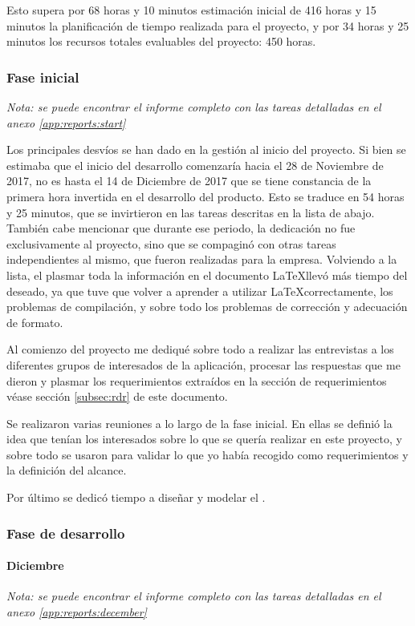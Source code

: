 Esto supera por 68 horas y 10 minutos estimación inicial de 416 horas y 15 
minutos la planificación de tiempo realizada para el proyecto, y por 34 horas y
25 minutos los recursos totales evaluables del proyecto: 450 horas.

\subsubsection{Fase inicial}
\textit{Nota: se puede encontrar el informe completo con las tareas detalladas
en el anexo \ref{app:reports:start}}

Los principales desvíos se han dado en la gestión al inicio del
proyecto. Si bien se estimaba que el inicio del desarrollo comenzaría hacia el
28 de Noviembre de 2017, no es hasta el 14 de Diciembre de 2017 que se tiene
constancia de la primera hora invertida en el desarrollo del producto. Esto se
traduce en 54 horas y 25 minutos, que se invirtieron en las tareas descritas en
la lista de abajo. También cabe mencionar que durante ese
periodo, la dedicación no fue exclusivamente al proyecto, sino que se compaginó
con otras tareas independientes al mismo, que fueron realizadas para la
empresa. Volviendo a la lista, el plasmar toda la
información en el documento \LaTeX llevó más tiempo del deseado, ya que tuve
que volver a aprender a utilizar \LaTeX correctamente, los problemas de
compilación, y sobre todo los problemas de corrección y adecuación de formato.

Al comienzo del proyecto me dediqué sobre todo a realizar las entrevistas a los
diferentes grupos de interesados de la aplicación, procesar las respuestas que me
dieron y plasmar los requerimientos extraídos en la sección de requerimientos \textemdash véase sección \ref{subsec:rdr} \textemdash
de este documento.

Se realizaron varias reuniones a lo largo de la fase inicial. En ellas se definió
la idea que tenían los interesados sobre lo que se quería realizar en este proyecto,
y sobre todo se usaron para validar lo que yo había recogido como requerimientos
y la definición del alcance.

Por último se dedicó tiempo a diseñar y modelar el .

\subsubsection{Fase de desarrollo}
\paragraph{Diciembre}
\textit{Nota: se puede encontrar el informe completo con las tareas detalladas
en el anexo \ref{app:reports:december}}

